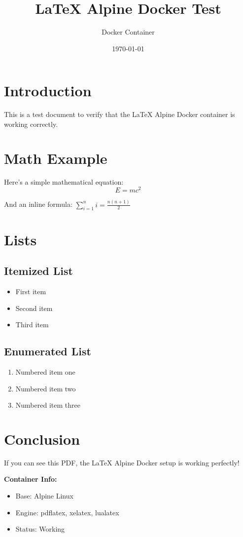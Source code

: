\documentclass[12pt,a4paper]{article}
\title{LaTeX Alpine Docker Test}
\author{Docker Container}
\date{\today}
\begin{document}
\maketitle

\section{Introduction}
This is a test document to verify that the LaTeX Alpine Docker container is working correctly.

\section{Math Example}
Here's a simple mathematical equation:
\begin{equation}
E = mc^2
\end{equation}

And an inline formula: $\sum_{i=1}^{n} i = \frac{n(n+1)}{2}$

\section{Lists}
\subsection{Itemized List}
\begin{itemize}
    \item First item
    \item Second item
    \item Third item
\end{itemize}

\subsection{Enumerated List}
\begin{enumerate}
    \item Numbered item one
    \item Numbered item two
    \item Numbered item three
\end{enumerate}

\section{Conclusion}
If you can see this PDF, the LaTeX Alpine Docker setup is working perfectly!

\textbf{Container Info:}
\begin{itemize}
    \item Base: Alpine Linux
    \item Engine: pdflatex, xelatex, lualatex
    \item Status: Working
\end{itemize}
\end{document}
